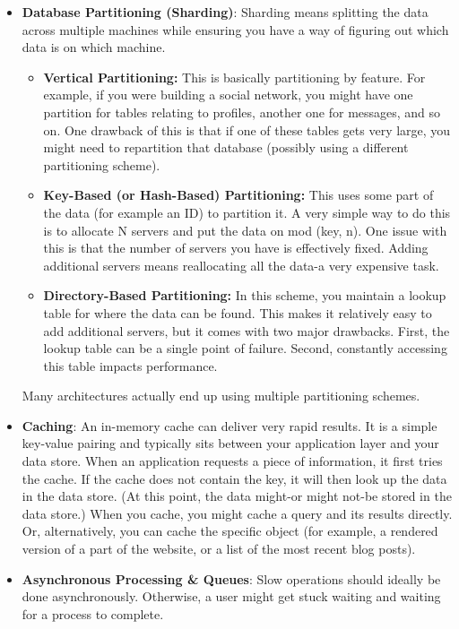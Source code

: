 \documentclass{report}
\begin{document}
\begin{itemize}
        \item \textbf{Database Partitioning (Sharding)}: Sharding means splitting the data across multiple machines while ensuring you have a way of figuring out which data is on which machine.
            \begin{itemize}
                \item \textbf{Vertical Partitioning:} This is basically partitioning by feature. For example, if you were building a social network, you might have one partition for tables relating to profiles, another one for messages, and so on. One drawback of this is that if one of these tables gets very large, you might need to repartition that database (possibly using a different partitioning scheme).
                \item \textbf{Key-Based (or Hash-Based) Partitioning:} This uses some part of the data (for example an ID) to partition it. A very simple way to do this is to allocate N servers and put the data on mod (key, n). One issue with this is that the number of servers you have is effectively fixed. Adding additional servers means reallocating all the data-a very expensive task.
                \item \textbf{Directory-Based Partitioning:} In this scheme, you maintain a lookup table for where the data can be found. This makes it relatively easy to add additional servers, but it comes with two major drawbacks. First, the lookup table can be a single point of failure. Second, constantly accessing this table impacts performance.
            \end{itemize}
            Many architectures actually end up using multiple partitioning schemes.
        \item \textbf{Caching}: An in-memory cache can deliver very rapid results. It is a simple key-value pairing and typically sits between your application layer and your data store.
            \bigbreak \noindent 
            When an application requests a piece of information, it first tries the cache. If the cache does not contain the key, it will then look up the data in the data store. (At this point, the data might-or might not-be stored in the data store.)
            \bigbreak \noindent 
            When you cache, you might cache a query and its results directly. Or, alternatively, you can cache the specific object (for example, a rendered version of a part of the website, or a list of the most recent blog posts).
        \item \textbf{Asynchronous Processing \& Queues}:  Slow operations should ideally be done asynchronously. Otherwise, a user might get stuck waiting and waiting for a process to complete.

\end{itemize}
\end{document}
